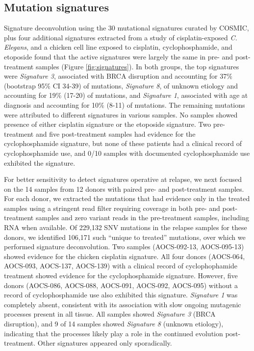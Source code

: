 \subsection*{Mutation signatures}
Signature deconvolution using the 30 mutational signatures curated by COSMIC\cite{364242}, plus four additional signatures extracted from a study of cisplatin-exposed \textit{C. Elegans}\cite{Meier_2014}, and a chicken cell line exposed to cisplatin, cyclophosphamide, and etoposide\cite{Szikriszt_2016} found that the active signatures were largely the same in pre- and post-treatment samples (Figure \ref{fig:signatures}). In both groups, the top signatures were \textit{Signature 3}, associated with BRCA disruption and accounting for 37\% (bootstrap 95\% CI 34-39) of mutations, \textit{Signature 8}, of unknown etiology and accounting for 19\% (17-20) of mutations, and \textit{Signature 1}, associated with age at diagnosis and accounting for 10\% (8-11) of mutations. The remaining mutations were attributed to different signatures in various samples. No samples showed presence of either cisplatin signature or the etoposide signature. Two pre-treatment and five post-treatment samples had evidence for the cyclophosphamide signature, but none of these patients had a clinical record of cyclophosphamide use, and 0/10 samples with documented cyclophosphamide use exhibited the signature.

For better sensitivity to detect signatures operative at relapse, we next focused on the 14 samples from 12 donors with paired pre- and post-treatment samples. For each donor, we extracted the mutations that had evidence only in the treated samples using a stringent read filter requiring coverage in both pre- and post-treatment samples and zero variant reads in the pre-treatment samples, including RNA when available. Of 229,132 SNV mutations in the relapse samples for these donors, we identified 106,171 such ``unique to treated'' mutations, over which we performed signature deconvolution. Two samples (AOCS-092-13, AOCS-095-13) showed evidence for the chicken cisplatin signature. All four donors (AOCS-064, AOCS-093, AOCS-137, AOCS-139) with a clinical record of cyclophophamide treatment showed evidence for the cyclophosphamide signature. However, five donors (AOCS-086, AOCS-088, AOCS-091, AOCS-092, AOCS-095) without a  record of cyclophosphamide use also exhibited this signature. \textit{Signature 1} was completely absent, consistent with its association with slow ongoing mutagenic processes present in all tissue. All samples showed \textit{Signature 3} (BRCA disruption), and 9 of 14 samples showed \textit{Signature 8} (unknown etiology), indicating that the processes likely play a role in the continued evolution post-treatment. Other signatures appeared only sporadically.

